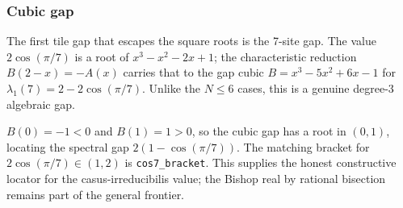 \subsubsection{Cubic gap}

\begin{theorem}\label{thm:tile7-cubic-gap}\leanok{}
The first tile gap that escapes the square roots is the 7-site gap. The value
$2\cos(\pi/7)$ is a root of $x^3-x^2-2x+1$; the characteristic reduction
$B(2-x)=-A(x)$ carries that to the gap cubic
$B=x^3-5x^2+6x-1$ for $\lambda_1(7)=2-2\cos(\pi/7)$. Unlike the $N\le6$
cases, this is a genuine degree-3 algebraic gap.
\end{theorem}

\begin{theorem}\label{thm:tile7-gap-bracket}\leanok{}
$B(0)=-1<0$ and $B(1)=1>0$, so the cubic gap has a root in $(0,1)$, locating
the spectral gap $2(1-\cos(\pi/7))$. The matching bracket for
$2\cos(\pi/7)\in(1,2)$ is \texttt{cos7\_bracket}. This supplies the honest
constructive locator for the casus-irreducibilis value; the Bishop real by
rational bisection remains part of the general frontier.
\end{theorem}
